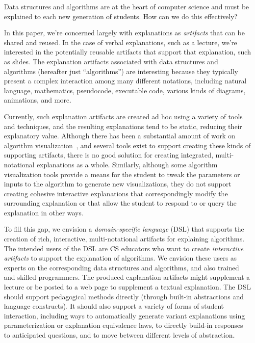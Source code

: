 \documentclass[conference]{IEEEtran}
\begin{document}
Data structures and algorithms are at the heart of computer science and must be
explained to each new generation of students. How can we do this effectively?


In this paper, we're concerned largely with explanations as \emph{artifacts}
that can be shared and reused. In the case of verbal explanations, such as a
lecture, we're interested in the potentially reusable artifacts that support
that explanation, such as slides.
%
The explanation artifacts associated with data structures and algorithms
(hereafter just ``algorithms'') are interesting because they typically present
a complex interaction among many different notations, including natural
language, mathematics, pseudocode, executable code, various kinds of diagrams,
animations, and more.


Currently, such explanation artifacts are created ad hoc using a variety of
tools and techniques, and the resulting explanations tend to be static,
reducing their explanatory value.
%
Although there has been a substantial amount of work on algorithm
visualization~\cite{Gloor92,Gloor97,HDS02,?}, and several tools exist to
support creating these kinds of supporting artifacts, there is no good solution
for creating integrated, multi-notational explanations as a whole. Similarly,
although some algorithm visualization tools provide a means for the student to
tweak the parameters or inputs to the algorithm to generate new visualizations,
they do not support creating cohesive interactive explanations that
correspondingly modify the surrounding explanation or that allow the student to
respond to or query the explanation in other ways.


To fill this gap, we envision a \emph{domain-specific language} (DSL) that
supports the creation of rich, interactive, multi-notational artifacts for
explaining algorithms. 
%
The intended users of the DSL are CS educators who want to create
\emph{interactive artifacts} to support the explanation of algorithms. We
envision these users as experts on the corresponding data structures and
algorithms, and also trained and skilled programmers. The produced explanation
artifacts might supplement a lecture or be posted to a web page to supplement a
textual explanation.
%
The DSL should support pedagogical methods directly (through built-in
abstractions and language constructs). It should also support a variety of
forms of student interaction, including ways to automatically generate variant
explanations using parameterization or explanation equivalence laws, to
directly build-in responses to anticipated questions, and to move between
different levels of abstraction.
\end{document}
